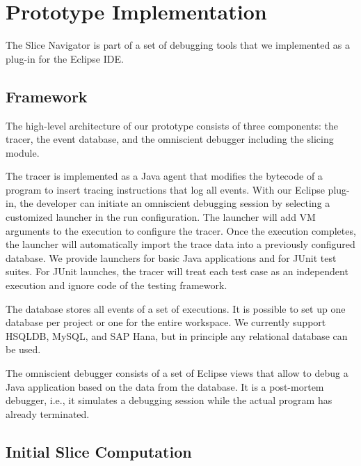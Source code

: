 \documentclass[
			english,
			]{elsarticle}
\begin{document}
\section{Prototype Implementation}
\label{sec:impl}

The Slice Navigator is part of a set of debugging tools that we implemented as a plug-in for the Eclipse IDE.

\subsection{Framework}

The high-level architecture of our prototype consists of three components: the tracer, the event database, and the omniscient debugger including the slicing module.

The tracer is implemented as a Java agent that modifies the bytecode of a program to insert tracing instructions that log all events.
With our Eclipse plug-in, the developer can initiate an omniscient debugging session by selecting a customized launcher in the run configuration.
The launcher will add VM arguments to the execution to configure the tracer.
Once the execution completes, the launcher will automatically import the trace data into a previously configured database.
We provide launchers for basic Java applications and for JUnit test suites.
For JUnit launches, the tracer will treat each test case as an independent execution and ignore code of the testing framework.

The database stores all events of a set of executions.
It is possible to set up one database per project or one for the entire workspace.
We currently support HSQLDB, MySQL, and SAP Hana, but in principle any relational database can be used.

The omniscient debugger consists of a set of Eclipse views that allow to debug a Java application based on the data from the database.
It is a post-mortem debugger, i.e., it simulates a debugging session while the actual program has already terminated.

\subsection{Initial Slice Computation}
\end{document}
